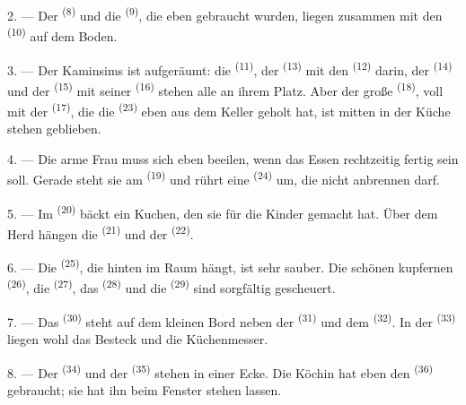 2. --- Der  \textsuperscript{(8)} und die 
\textsuperscript{(9)}, die eben gebraucht wurden, liegen zusammen mit den
 \textsuperscript{(10)} auf dem Boden.

3. --- Der Kaminsims ist aufgeräumt: die  \textsuperscript{(11)}, der
 \textsuperscript{(13)} mit den 
\textsuperscript{(12)} darin, der  \textsuperscript{(14)} und der
 \textsuperscript{(15)} mit seiner 
\textsuperscript{(16)} stehen alle an ihrem Platz. Aber der große
 \textsuperscript{(18)}, voll mit der 
\textsuperscript{(17)}, die die  \textsuperscript{(23)} eben aus dem
Keller geholt hat, ist mitten in der Küche stehen geblieben.

4. --- Die arme Frau muss sich eben beeilen, wenn das Essen rechtzeitig fertig sein
soll. Gerade steht sie am  \textsuperscript{(19)} und rührt eine
 \textsuperscript{(24)} um, die nicht anbrennen darf.

5. --- Im  \textsuperscript{(20)} bäckt ein Kuchen, den sie für die
Kinder gemacht hat. Über dem Herd hängen die 
\textsuperscript{(21)} und der  \textsuperscript{(22)}.

\VUsaut{4.0mm}
\VUsaut{3.0mm}

6. --- Die  \textsuperscript{(25)}, die hinten im Raum
hängt, ist sehr sauber. Die schönen kupfernen 
\textsuperscript{(26)}, die  \textsuperscript{(27)}, das
 \textsuperscript{(28)} und die  \textsuperscript{(29)}
sind sorgfältig gescheuert.

7. --- Das  \textsuperscript{(30)} steht auf dem kleinen Bord neben
der  \textsuperscript{(31)} und dem 
\textsuperscript{(32)}. In der  \textsuperscript{(33)} liegen wohl
das Besteck und die Küchenmesser.

8. --- Der  \textsuperscript{(34)} und der 
\textsuperscript{(35)} stehen in einer Ecke. Die Köchin hat eben den
 \textsuperscript{(36)} gebraucht; sie hat ihn beim Fenster stehen
lassen.

